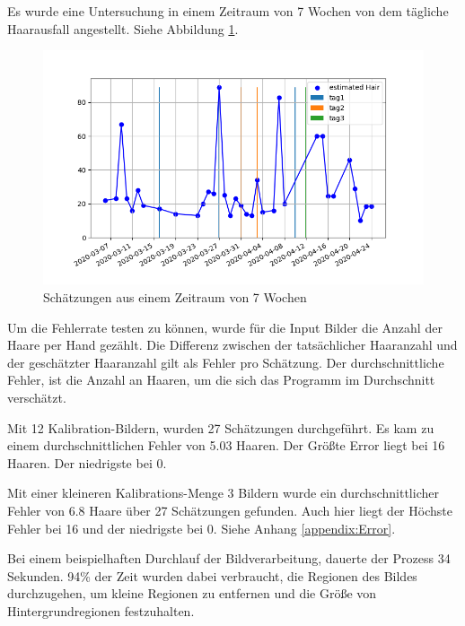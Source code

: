 \documentclass[german,a4paper, 12pt]{llncs}
\begin{document}
Es wurde eine Untersuchung in einem Zeitraum von 7 Wochen von dem tägliche Haarausfall angestellt. Siehe Abbildung \ref{img:7weeks}.
\begin{figure}
	\centering
	\includegraphics[width=.9\textwidth]{fig64/plot.png}
	\caption[]{Schätzungen aus einem Zeitraum von 7 Wochen}
	\label{img:7weeks}
\end{figure} 

Um die Fehlerrate testen zu können, wurde für die Input Bilder die Anzahl der Haare per Hand gezählt.
Die Differenz zwischen der tatsächlicher Haaranzahl und der geschätzter Haaranzahl gilt als Fehler pro Schätzung. Der durchschnittliche Fehler, ist die Anzahl an Haaren, um die sich das Programm im Durchschnitt verschätzt. 

Mit 12 Kalibration-Bildern, wurden 27 Schätzungen durchgeführt. Es kam zu einem durchschnittlichen Fehler von 5.03 Haaren.
Der Größte Error liegt bei 16 Haaren. Der niedrigste bei 0. 

Mit einer kleineren Kalibrations-Menge 3 Bildern wurde ein durchschnittlicher Fehler von 6.8 Haare über 27 Schätzungen gefunden. Auch hier liegt der Höchste Fehler bei 16 und der niedrigste bei 0. Siehe Anhang \ref{appendix:Error}.

Bei einem beispielhaften Durchlauf der Bildverarbeitung, dauerte der Prozess 34 Sekunden. 94\% der Zeit wurden dabei verbraucht, die Regionen des Bildes durchzugehen, um kleine Regionen zu entfernen und die Größe von Hintergrundregionen festzuhalten.
\end{document}
